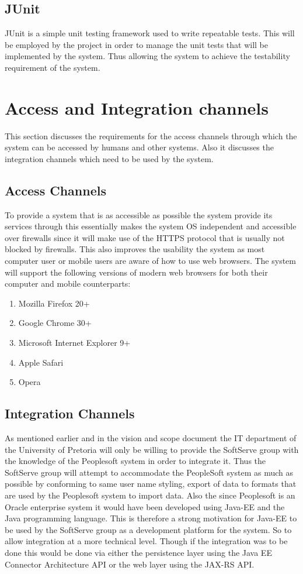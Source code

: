 \documentclass[12pt]{article}
\begin{document}
\subsection{JUnit}
JUnit is a simple unit testing framework used to write repeatable tests. This will be employed by the project in order to manage the unit tests that will be implemented by the system. Thus allowing the system to achieve the testability requirement of the system.

\section{Access and Integration channels}
This section discusses the requirements for the access channels through which the system can be accessed by humans and other systems. Also it discusses the integration channels which need to be used by the system. 

\subsection{Access Channels}
To provide a system that is as accessible as possible the system provide its services through this essentially makes the system OS independent and accessible over firewalls since it will make use of the HTTPS protocol that is usually not blocked by firewalls. This also improves the usability the system as most computer user or mobile users are aware of how to use web browsers. The system will support the following versions of modern web browsers for both their computer and mobile counterparts:
\begin{enumerate}
\item Mozilla Firefox 20+
\item Google Chrome 30+
\item Microsoft Internet Explorer 9+
\item Apple Safari
\item Opera
\end{enumerate}

\subsection{Integration Channels}
As mentioned earlier and in the vision and scope document the IT department of the University of Pretoria will only be willing to provide the SoftServe group with the knowledge of the Peoplesoft system in order to integrate it. Thus the SoftServe group will attempt to accommodate the PeopleSoft system as much as possible by conforming to same user name styling, export of data to formats that are used by the Peoplesoft system to import data. Also the since Peoplesoft is an Oracle enterprise system it would have been developed using Java-EE and the Java programming language. This is therefore a strong motivation for Java-EE to be used by the SoftServe group as a development platform for the system. So to allow integration at a more technical level. Though if the integration was to be done this would be done via either the persistence layer using the Java EE Connector Architecture  API or the web layer using the JAX-RS API.  
\end{document}
